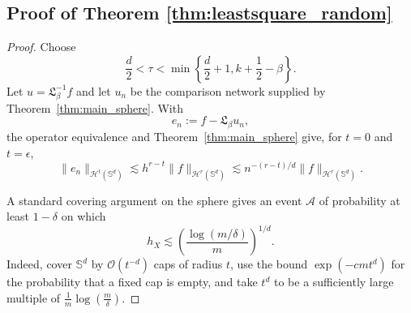 \documentclass{article}
\numberwithin{equation}{section}
\def\SS{\mathbb{S}}
\begin{document}
\subsection{Proof of Theorem \ref{thm:leastsquare_random}}
\begin{proof}
Choose
\begin{equation*}
\frac d2<\tau<\min\left\{\frac d2+1,k+\frac12-\beta\right\}.
\end{equation*}
Let $u=\mathfrak L_\beta^{-1}f$ and let $u_n$ be the comparison network supplied by Theorem~\ref{thm:main_sphere}. With
\begin{equation*}
e_n:=f-\mathfrak L_\beta u_n,
\end{equation*}
the operator equivalence and Theorem~\ref{thm:main_sphere} give, for $t=0$ and $t=\epsilon$,
\begin{equation}\label{eqn:random_comparator}
\|e_n\|_{\mathcal H^t(\SS^d)}\lesssim h^{r-t}\|f\|_{\mathcal H^r(\SS^d)}\lesssim n^{-(r-t)/d}\|f\|_{\mathcal H^r(\SS^d)}.
\end{equation}

A standard covering argument on the sphere gives an event $\mathcal A$ of probability at least $1-\delta$ on which
\begin{equation}\label{eqn:random_fill}
h_X\lesssim\left(\frac{\log(m/\delta)}{m}\right)^{1/d}.
\end{equation}
Indeed, cover $\SS^d$ by $\mathcal O(t^{-d})$ caps of radius $t$, use the bound $\exp(-cmt^d)$ for the probability that a fixed cap is empty, and take $t^d$ to be a sufficiently large multiple of $\frac{1}{m}\log(\frac m\delta)$.


\end{proof}
\end{document}
